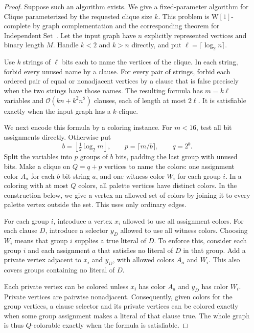 \documentclass[11pt]{article}
\begin{document}
\begin{proof}
Suppose such an algorithm exists. We give a fixed-parameter algorithm
for Clique parameterized by the requested clique size \(k\).
This problem is \(\mathrm{W[1]}\)-complete by graph complementation and
the corresponding theorem for Independent Set~\cite{df}.
Let the input graph have \(n\) explicitly represented vertices and binary
length \(M\). Handle \(k<2\) and \(k>n\) directly, and put
\(\ell=\lceil\log_2 n\rceil\).

Use \(k\) strings of \(\ell\) bits each to name the vertices of the
clique. In each string, forbid every unused name by a clause. For every
pair of strings, forbid each ordered pair of equal or nonadjacent
vertices by a clause that is false precisely when the two strings have
those names. The resulting formula has \(m=k\ell\) variables and
\(\mathcal O(kn+k^2n^2)\) clauses, each of length at most \(2\ell\).
It is satisfiable exactly when the input graph has a \(k\)-clique.

We next encode this formula by a coloring instance. For \(m<16\), test
all bit assignments directly. Otherwise put
\[
 b=\left\lfloor\tfrac12\log_2 m\right\rfloor,\qquad
 p=\lceil m/b\rceil,\qquad q=2^b .
\]
Split the variables into \(p\) groups of \(b\) bits, padding the last
group with unused bits. Make a clique on \(Q=q+p\) vertices to name
the colors: one assignment color \(A_a\) for each \(b\)-bit string
\(a\), and one witness color \(W_i\) for each group \(i\).
In a coloring with at most \(Q\) colors, all palette vertices have
distinct colors. In the construction below, we give a vertex an
allowed set of colors by joining it to every palette vertex outside
the set. This uses only ordinary edges.

For each group \(i\), introduce a vertex \(x_i\) allowed to use all
assignment colors. For each clause \(D\), introduce a selector
\(y_D\) allowed to use all witness colors. Choosing \(W_i\) means
that group \(i\) supplies a true literal of \(D\). To enforce this,
consider each group \(i\) and each assignment \(a\) that satisfies
no literal of \(D\) in that group. Add a private vertex adjacent to
\(x_i\) and \(y_D\), with allowed colors \(A_a\) and \(W_i\).
This also covers groups containing no literal of \(D\).

Each private vertex can be colored unless \(x_i\) has color \(A_a\)
and \(y_D\) has color \(W_i\). Private vertices are pairwise
nonadjacent. Consequently, given colors for the group vertices, a
clause selector and its private vertices can be colored exactly
when some group assignment makes a literal of that clause true.
The whole graph is thus \(Q\)-colorable exactly when the formula
is satisfiable.


\end{proof}
\end{document}
